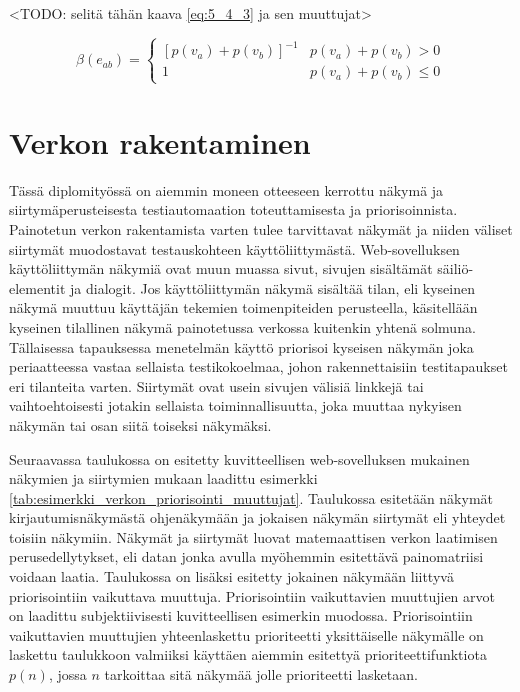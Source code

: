   <TODO: selitä tähän kaava \ref{eq:5_4_3} ja sen muuttujat>

  \begin{equation} \label{eq:5_4_3}
    \beta(e_{ab}) = \begin{cases}
      [p(v_a) + p(v_b)]^{-1} & p(v_a) + p(v_b) > 0 \\
      1 & p(v_a) + p(v_b) \leq 0
    \end{cases}
  \end{equation}

\section{Verkon rakentaminen} \label{ch:10_verkon_rakentaminen}

  Tässä diplomityössä on aiemmin moneen otteeseen kerrottu näkymä ja siirtymäperusteisesta testiautomaation toteuttamisesta ja priorisoinnista.
  Painotetun verkon rakentamista varten tulee tarvittavat näkymät ja niiden väliset siirtymät muodostavat testauskohteen käyttöliittymästä.
  Web-sovelluksen käyttöliittymän näkymiä ovat muun muassa sivut, sivujen sisältämät säiliö-elementit ja dialogit.
  Jos käyttöliittymän näkymä sisältää tilan, eli kyseinen näkymä muuttuu käyttäjän tekemien toimenpiteiden perusteella, käsitellään kyseinen tilallinen näkymä painotetussa verkossa kuitenkin yhtenä solmuna.
  Tällaisessa tapauksessa menetelmän käyttö priorisoi kyseisen näkymän joka periaatteessa vastaa sellaista testikokoelmaa, johon rakennettaisiin testitapaukset eri tilanteita varten.
  Siirtymät ovat usein sivujen välisiä linkkejä tai vaihtoehtoisesti jotakin sellaista toiminnallisuutta, joka muuttaa nykyisen näkymän tai osan siitä toiseksi näkymäksi.

  Seuraavassa taulukossa on esitetty kuvitteellisen web-sovelluksen mukainen näkymien ja siirtymien mukaan laadittu esimerkki \ref{tab:esimerkki_verkon_priorisointi_muuttujat}.
  Taulukossa esitetään näkymät kirjautumisnäkymästä ohjenäkymään ja jokaisen näkymän siirtymät eli yhteydet toisiin näkymiin.
  Näkymät ja siirtymät luovat matemaattisen verkon laatimisen perusedellytykset, eli datan jonka avulla myöhemmin esitettävä painomatriisi voidaan laatia.
  Taulukossa on lisäksi esitetty jokainen näkymään liittyvä priorisointiin vaikuttava muuttuja.
  Priorisointiin vaikuttavien muuttujien arvot on laadittu subjektiivisesti kuvitteellisen esimerkin muodossa.
  Priorisointiin vaikuttavien muuttujien yhteenlaskettu prioriteetti yksittäiselle näkymälle on laskettu taulukkoon valmiiksi käyttäen aiemmin esitettyä prioriteettifunktiota \(p(n)\), jossa \(n\) tarkoittaa sitä näkymää jolle prioriteetti lasketaan.

